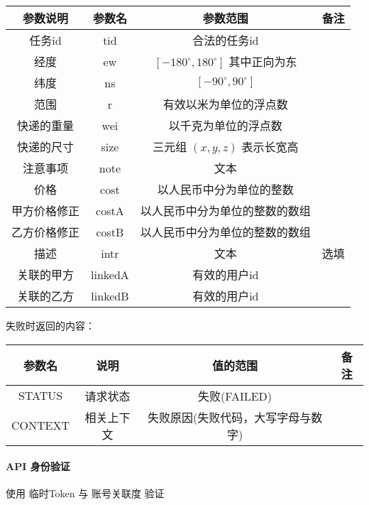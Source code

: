 \documentclass[UTF8]{dingo}
\def\apiauth{\paragraph{\colorbox[rgb]{0.45,0.9,1}{API 身份验证}}} %
\def\失败{\colorbox[rgb]{1,0.5,0.5}{失败}}
\def\失败V{失败(FAILED)}
\def\失败原因{失败原因(失败代码，大写字母与数字)}
\begin{document}
    \begin{tabular}{|c|c|c|c|}
        \hline \rule[-2ex]{0pt}{5.5ex} 参数说明 & 参数名 & 参数范围 & 备注 \\ 
        \hline \rule[-2ex]{0pt}{5.5ex} 任务id & tid & 合法的任务id &  \\
        \hline \rule[-2ex]{0pt}{5.5ex} 经度 & ew & $[-180^\circ,180^\circ]$ 其中正向为东 &  \\
        \hline \rule[-2ex]{0pt}{5.5ex} 纬度 & ns & $[-90^\circ,90^\circ]$ &  \\
        \hline \rule[-2ex]{0pt}{5.5ex} 范围 & r & 有效以米为单位的浮点数 &  \\
        \hline \rule[-2ex]{0pt}{5.5ex} 快递的重量 & wei & 以千克为单位的浮点数 &  \\
        \hline \rule[-2ex]{0pt}{5.5ex} 快递的尺寸 & size & 三元组 $(x,y,z)$ 表示长宽高 &  \\
        \hline \rule[-2ex]{0pt}{5.5ex} 注意事项 & note & 文本 &  \\
        \hline \rule[-2ex]{0pt}{5.5ex} 价格 & cost & 以人民币中分为单位的整数 &  \\
        \hline \rule[-2ex]{0pt}{5.5ex} 甲方价格修正 & costA & 以人民币中分为单位的整数的数组 &  \\
        \hline \rule[-2ex]{0pt}{5.5ex} 乙方价格修正 & costB & 以人民币中分为单位的整数的数组 &  \\
        \hline \rule[-2ex]{0pt}{5.5ex} 描述 & intr & 文本 & 选填 \\
        \hline \rule[-2ex]{0pt}{5.5ex} 关联的甲方 & linkedA & 有效的用户id &  \\
        \hline \rule[-2ex]{0pt}{5.5ex} 关联的乙方 & linkedB & 有效的用户id &  \\
        \hline
    \end{tabular}
    \par \失败 时返回的内容：\\
    \begin{tabular}{|c|c|c|c|}
        \hline \rule[-2ex]{0pt}{5.5ex} 参数名 & 说明 & 值的范围 & 备注 \\
        \hline \rule[-2ex]{0pt}{5.5ex} STATUS & 请求状态 & \失败V &  \\
        \hline \rule[-2ex]{0pt}{5.5ex} CONTEXT & 相关上下文 & \失败原因 &  \\
        \hline
    \end{tabular}
    \apiauth
    使用 临时Token 与 账号关联度 验证
\end{document}
